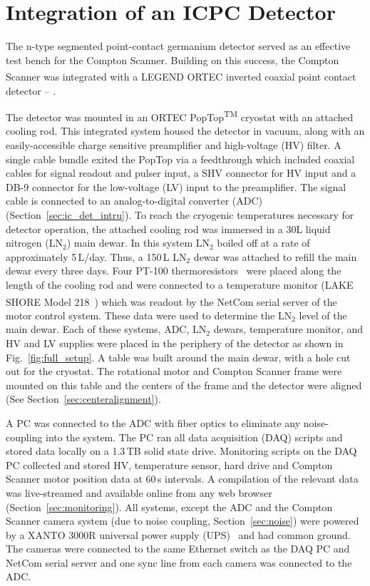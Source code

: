 \chapter{Integration of an ICPC Detector}\label{chap:integration}

The n-type segmented point-contact germanium detector served as an effective test bench for the Compton Scanner. Building on this success, the Compton Scanner was integrated with a LEGEND ORTEC\textsuperscript{\tiny\textregistered} inverted coaxial point contact detector -- \IC{}. 

The detector was mounted in an ORTEC\textsuperscript{\tiny\textregistered} PopTop\textsuperscript{\tiny TM} cryostat with an attached cooling rod. This integrated system housed the detector in vacuum, along with an easily-accessible charge sensitive preamplifier and high-voltage (HV) filter. A single cable bundle exited the PopTop via a feedthrough which included coaxial cables for signal readout and pulser input, a SHV connector for HV input and a DB-9 connector for the low-voltage (LV) input to the preamplifier. The signal cable is connected to an analog-to-digital converter (ADC) (Section~\ref{sec:ic_det_intru}). To reach the cryogenic temperatures necessary for detector operation, the attached cooling rod was immersed in a 30L liquid nitrogen (LN$_2$) main dewar. In this system LN$_2$ boiled off at a rate of approximately 5\,L/day. Thus, a 150\,L LN$_2$ dewar was attached to refill the main dewar every three days. Four PT-100 thermoresistors~\cite{pt100} were placed along the length of the cooling rod and were connected to a temperature monitor (LAKE SHORE\textsuperscript{\tiny\textregistered} Model 218~\cite{lakeshore}) which was readout by the NetCom serial server of the motor control system. These data were used to determine the LN$_2$ level of the main dewar.  Each of these systems, ADC, LN$_2$ dewars, temperature monitor, and HV and LV supplies were placed in the periphery of the detector as shown in Fig.~\ref{fig:full_setup}. A table was built around the main dewar, with a hole cut out for the cryostat. The rotational motor and Compton Scanner frame were mounted on this table and the centers of the frame and the detector were aligned (See Section~\ref{sec:centeralignment}).

A PC was connected to the ADC with fiber optics to eliminate any noise-coupling into the system. The PC ran all data acquisition (DAQ) scripts and stored data locally on a 1.3\,TB solid state drive. Monitoring scripts on the DAQ PC collected and stored HV, temperature sensor, hard drive and Compton Scanner motor position data at 60\,s intervals. A compilation of the relevant data was live-streamed and available online from any web browser (Section~\ref{sec:monitoring}). All systems, except the ADC and the Compton Scanner camera system (due to noise coupling, Section~\ref{sec:noise}) were powered by a XANTO 3000R universal power supply (UPS)~\cite{ups} and had common ground. The cameras were connected to the same Ethernet switch as the DAQ PC and NetCom serial server and one sync line from each camera was connected to the ADC.

